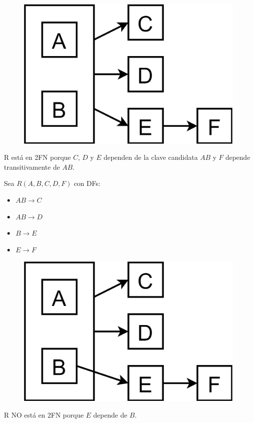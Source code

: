 \documentclass{templateNote}
\begin{document}
\begin{itemize}
\begin{enumerate}
        \begin{figure}[H]
            \centering
            \colorbox{green!20!white}{\includegraphics[scale=0.08]{img/2FN.png}}
        \end{figure}

        R está en 2FN porque $C$, $D$ y $E$ dependen de la clave candidata $AB$ y $F$ depende transitivamente de $AB$.
        
        Sea $R(A,B,C,D,F)$ con DFs:
        \begin{itemize}
            \item $AB \rightarrow C$
            \item $AB \rightarrow D$
            \item $B \rightarrow E$
            \item $E \rightarrow F$
        \end{itemize}

        \begin{figure}[H]
            \centering
            \colorbox{red!20!white}{\includegraphics[scale=0.08]{img/NO2FN.png}}
        \end{figure}
        R NO está en 2FN porque $E$ depende de $B$.


\end{enumerate}
\end{itemize}
\end{document}
